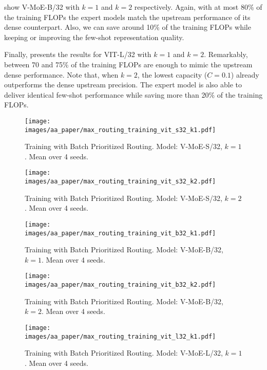 \documentclass{article}
\newcommand{\abbv}{{V-MoE}}
\newcommand{\maxrouting}{Batch Prioritized Routing}
\begin{document}
 show \abbv{}-B/32 with $k=1$ and $k=2$ respectively.
Again, with at most 80\% of the training FLOPs the expert models match the upstream performance of its dense counterpart.
Also, we can save around 10\% of the training FLOPs while keeping or improving the few-shot representation quality.

Finally,  presents the results for VIT-L/32 with $k=1$ and $k=2$.
Remarkably, between 70 and 75\% of the training FLOPs are enough to mimic the upstream dense performance.
Note that, when $k=2$, the lowest capacity ($C=0.1$) already outperforms the dense upstream precision.
The expert model is also able to deliver identical few-shot performance while saving more than 20\% of the training FLOPs.

\begin{figure}[h]
\centering
\texttt{[image: images/aa\_paper/max\_routing\_training\_vit\_s32\_k1.pdf]}
\caption{Training with \maxrouting{}. Model: \abbv{}-S/32, $k = 1$. Mean over 4 seeds.}
\label{im:training_max_routing_vit_s_k1}
\end{figure}

\begin{figure}[h]
\centering
\texttt{[image: images/aa\_paper/max\_routing\_training\_vit\_s32\_k2.pdf]}
\caption{Training with \maxrouting{}. Model: \abbv{}-S/32, $k = 2$. Mean over 4 seeds.}
\label{im:training_max_routing_vit_s}
\end{figure}

\begin{figure}[h]
\centering
\texttt{[image: images/aa\_paper/max\_routing\_training\_vit\_b32\_k1.pdf]}
\caption{Training with \maxrouting{}. Model: \abbv{}-B/32, $k = 1$. Mean over 4 seeds.}
\label{im:training_max_routing_vit_b_k1}
\end{figure}


\begin{figure}[h]
\centering
\texttt{[image: images/aa\_paper/max\_routing\_training\_vit\_b32\_k2.pdf]}
\caption{Training with \maxrouting{}. Model: \abbv{}-B/32, $k = 2$. Mean over 4 seeds.}
\label{im:training_max_routing_vit_b}
\end{figure}


\begin{figure}[h]
\centering
\texttt{[image: images/aa\_paper/max\_routing\_training\_vit\_l32\_k1.pdf]}
\caption{Training with \maxrouting{}. Model: \abbv{}-L/32, $k = 1$. Mean over 4 seeds.}
\label{im:training_max_routing_vit_l_k1}
\end{figure}
\end{document}
